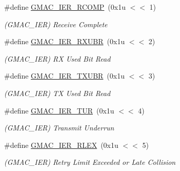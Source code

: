 \begin{DoxyCompactItemize}
\mbox{\label{group__SAME70__GMAC_ga377a5741783b964bffd1ecafe4d723e8}} 
\#define \mbox{\hyperlink{group__SAME70__GMAC_ga377a5741783b964bffd1ecafe4d723e8}{G\+M\+A\+C\+\_\+\+I\+E\+R\+\_\+\+R\+C\+O\+MP}}~(0x1u $<$$<$ 1)
\begin{DoxyCompactList}\small\item\em (G\+M\+A\+C\+\_\+\+I\+ER) Receive Complete \end{DoxyCompactList}\item 
\mbox{\label{group__SAME70__GMAC_gad88b2a426077596643df370fc9d7b03b}} 
\#define \mbox{\hyperlink{group__SAME70__GMAC_gad88b2a426077596643df370fc9d7b03b}{G\+M\+A\+C\+\_\+\+I\+E\+R\+\_\+\+R\+X\+U\+BR}}~(0x1u $<$$<$ 2)
\begin{DoxyCompactList}\small\item\em (G\+M\+A\+C\+\_\+\+I\+ER) RX Used Bit Read \end{DoxyCompactList}\item 
\mbox{\label{group__SAME70__GMAC_gaff927dc345830a36276530ae3fdefadf}} 
\#define \mbox{\hyperlink{group__SAME70__GMAC_gaff927dc345830a36276530ae3fdefadf}{G\+M\+A\+C\+\_\+\+I\+E\+R\+\_\+\+T\+X\+U\+BR}}~(0x1u $<$$<$ 3)
\begin{DoxyCompactList}\small\item\em (G\+M\+A\+C\+\_\+\+I\+ER) TX Used Bit Read \end{DoxyCompactList}\item 
\mbox{\label{group__SAME70__GMAC_gade1836f08515e2522b57d6fb10e112ef}} 
\#define \mbox{\hyperlink{group__SAME70__GMAC_gade1836f08515e2522b57d6fb10e112ef}{G\+M\+A\+C\+\_\+\+I\+E\+R\+\_\+\+T\+UR}}~(0x1u $<$$<$ 4)
\begin{DoxyCompactList}\small\item\em (G\+M\+A\+C\+\_\+\+I\+ER) Transmit Underrun \end{DoxyCompactList}\item 
\mbox{\label{group__SAME70__GMAC_gac2c5e90843442f806fad3c378d52f924}} 
\#define \mbox{\hyperlink{group__SAME70__GMAC_gac2c5e90843442f806fad3c378d52f924}{G\+M\+A\+C\+\_\+\+I\+E\+R\+\_\+\+R\+L\+EX}}~(0x1u $<$$<$ 5)
\begin{DoxyCompactList}\small\item\em (G\+M\+A\+C\+\_\+\+I\+ER) Retry Limit Exceeded or Late Collision \end{DoxyCompactList}\item 
$$
\end{DoxyCompactItemize}
